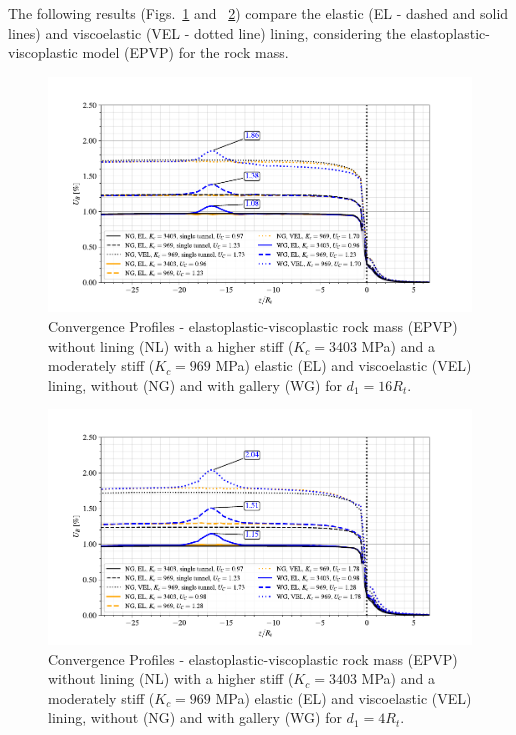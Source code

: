 \documentclass[a4paper,fleqn]{cas-sc}
\begin{document}
The following results (Figs.~\ref{EPVP_EL_VEL_d1_16Ri} and ~\ref{EPVP_EL_VEL_d1_4Ri}) compare the elastic (EL - dashed and solid lines) and viscoelastic (VEL - dotted line) lining, considering the elastoplastic-viscoplastic model (EPVP) for the rock mass. 
\begin{figure}[h!]
	\centering
	\includegraphics[scale=0.9]{Convergence Profiles - EPVP_EL_VEL_d1_16Ri_anotate.pdf}
	\caption{Convergence Profiles - elastoplastic-viscoplastic rock mass (EPVP) without lining (NL) with a higher stiff ($K_c = 3403$ MPa) and a moderately stiff ($K_c = 969$ MPa) elastic (EL) and viscoelastic (VEL) lining, without (NG) and with gallery (WG) for $d_1 = 16R_t$.}
	\label{EPVP_EL_VEL_d1_16Ri}
\end{figure}
\FloatBarrier
\begin{figure}[h!]
	\centering
	\includegraphics[scale=0.9]{Convergence Profiles - EPVP_EL_VEL_d1_4Ri_anotate.pdf}
	\caption{Convergence Profiles - elastoplastic-viscoplastic rock mass (EPVP) without lining (NL) with a higher stiff ($K_c = 3403$ MPa) and a moderately stiff ($K_c = 969$ MPa) elastic (EL) and viscoelastic (VEL) lining, without (NG) and with gallery (WG) for $d_1 = 4R_t$.}
	\label{EPVP_EL_VEL_d1_4Ri}
\end{figure}
\end{document}
